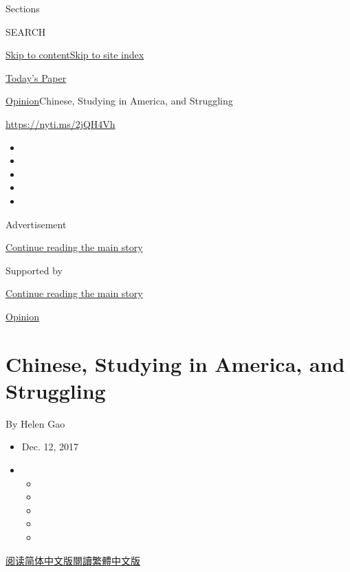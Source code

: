Sections

SEARCH

\protect\hyperlink{site-content}{Skip to
content}\protect\hyperlink{site-index}{Skip to site index}

\href{https://myaccount.nytimes3xbfgragh.onion/auth/login?response_type=cookie\&client_id=vi}{}

\href{https://www.nytimes3xbfgragh.onion/section/todayspaper}{Today's
Paper}

\href{/section/opinion}{Opinion}\textbar{}Chinese, Studying in America,
and Struggling

\href{https://nyti.ms/2jQH4Vh}{https://nyti.ms/2jQH4Vh}

\begin{itemize}
\item
\item
\item
\item
\item
\end{itemize}

Advertisement

\protect\hyperlink{after-top}{Continue reading the main story}

Supported by

\protect\hyperlink{after-sponsor}{Continue reading the main story}

\href{/section/opinion}{Opinion}

\hypertarget{chinese-studying-in-america-and-struggling}{%
\section{Chinese, Studying in America, and
Struggling}\label{chinese-studying-in-america-and-struggling}}

By Helen Gao

\begin{itemize}
\item
  Dec. 12, 2017
\item
  \begin{itemize}
  \item
  \item
  \item
  \item
  \item
  \end{itemize}
\end{itemize}

\href{http://cn.nytimes3xbfgragh.onion/opinion/20171213/chinese-students-mental-health/}{阅读简体中文版}\href{http://cn.nytimes3xbfgragh.onion/opinion/20171213/chinese-students-mental-health/zh-hant/}{閱讀繁體中文版}

